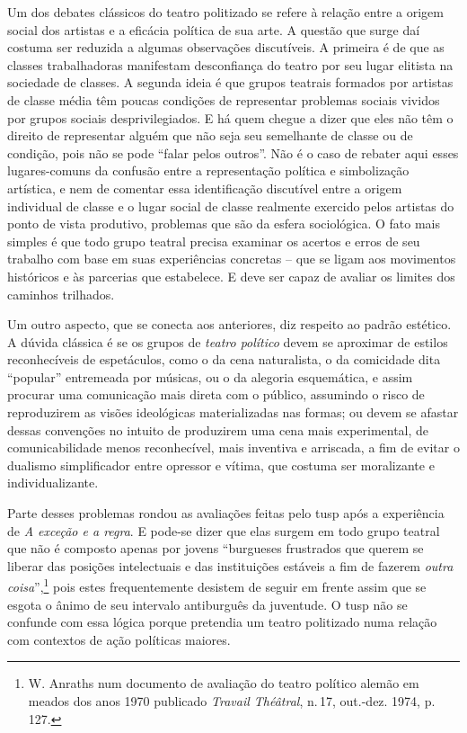 \noindent{}Um dos debates clássicos do teatro politizado se refere à relação entre
a origem social dos artistas e a eficácia política de sua arte. A
questão que surge daí costuma ser reduzida a algumas observações
discutíveis. A primeira é de que as classes trabalhadoras manifestam
desconfiança do teatro por seu lugar elitista na sociedade de classes. A
segunda ideia é que grupos teatrais formados por artistas de classe
média têm poucas condições de representar problemas sociais vividos por
grupos sociais desprivilegiados. E há quem chegue a dizer que eles não
têm o direito de representar alguém que não seja seu semelhante de
classe ou de condição, pois não se pode “falar pelos outros”. Não é o
caso de rebater aqui esses lugares-comuns da confusão entre a
representação política e simbolização artística, e nem de comentar essa
identificação discutível entre a origem individual de classe e o lugar
social de classe realmente exercido pelos artistas do ponto de vista
produtivo, problemas que são da esfera sociológica. O fato mais simples
é que todo grupo teatral precisa examinar os acertos e erros de seu
trabalho com base em suas experiências concretas -- que se ligam aos
movimentos históricos e às parcerias que estabelece. E deve ser capaz de
avaliar os limites dos caminhos trilhados.

Um outro aspecto, que se conecta aos anteriores, diz respeito ao padrão
estético. A dúvida clássica é se os grupos de {\it teatro político}
devem se aproximar de estilos reconhecíveis de espetáculos, como o da
cena naturalista, o da comicidade dita “popular” entremeada por músicas,
ou o da alegoria esquemática, e assim procurar uma comunicação mais
direta com o público, assumindo o risco de reproduzirem as visões
ideológicas materializadas nas formas; ou devem se afastar dessas
convenções no intuito de produzirem uma cena mais experimental, de
comunicabilidade menos reconhecível, mais inventiva e arriscada, a fim
de evitar o dualismo simplificador entre opressor e vítima, que costuma
ser moralizante e individualizante.

Parte desses problemas rondou as avaliações feitas pelo {\sc tusp} após a
experiência de {\it A exceção e a regra}. E pode-se dizer que elas
surgem em todo grupo teatral que não é composto apenas por jovens
“burgueses frustrados que querem se liberar das posições intelectuais e
das instituições estáveis a fim de fazerem {\it outra
coisa}”,\footnote{W. Anraths num documento de avaliação do teatro
  político alemão em meados dos anos 1970 publicado {\it Travail
  Théâtral}, n.\,17, out.-dez. 1974, p.\,127.} pois estes frequentemente
desistem de seguir em frente assim que se esgota o ânimo de seu
intervalo antiburguês da juventude. O {\sc tusp} não se confunde com essa
lógica porque pretendia um teatro politizado numa relação com contextos
de ação políticas maiores.

